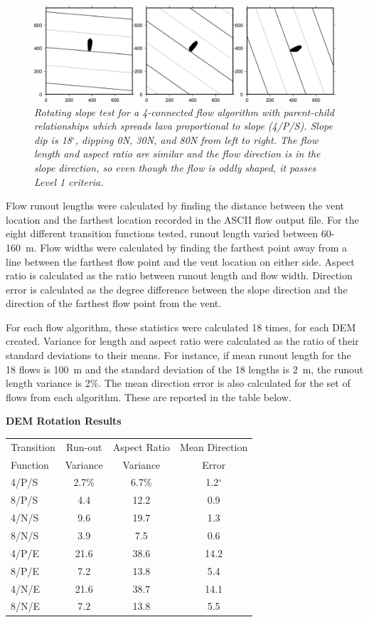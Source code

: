 \documentclass[12pt,letter]{article}
\begin{document}
	\begin{figure}[h!]
		\centering
		\includegraphics[width=\linewidth]{lava_C_4N_slope}
		\caption{\textit{Rotating slope test for a 4-connected flow algorithm with parent-child relationships which spreads lava proportional to slope (4/P/S). Slope dip is 18$^{\circ}$, dipping 0N, 30N, and 80N from left to right. The flow length and aspect ratio are similar and the flow direction is in the slope direction, so even though the flow is oddly shaped, it passes Level 1 criteria.}}
		\label{fig:slope}
	\end{figure}
	
	Flow runout lengths were calculated by finding the distance between the vent location and the farthest location recorded in the ASCII flow output file. For the eight different transition functions tested, runout length varied between 60-160~m. Flow widths were calculated by finding the farthest point away from a line between the farthest flow point and the vent location on either side. Aspect ratio is calculated as the ratio between runout length and flow width. Direction error is calculated as the degree difference between the slope direction and the direction of the farthest flow point from the vent.
	
	For each flow algorithm, these statistics were calculated 18 times, for each DEM created. Variance for length and aspect ratio were calculated as the ratio of their standard deviations to their means. For instance, if mean runout length for the 18 flows is 100~m and the standard deviation of the 18 lengths is 2~m, the runout length variance is 2\%. The mean direction error is also calculated for the set of flows from each algorithm. These are reported in the table below.

		\begin{center}
			\textbf{DEM Rotation Results}
			\begin{tabular}{l c c c}
				\toprule
				Transition&Run-out&Aspect Ratio&Mean Direction\\
				Function&Variance&Variance&Error\\
				\midrule
				4/P/S &2.7\%&6.7\%&1.2$^{\circ}$\\
				8/P/S &4.4&12.2&0.9\\
				4/N/S &9.6&19.7&1.3\\
				8/N/S &3.9&7.5&0.6\\
				4/P/E &21.6&38.6&14.2\\
				8/P/E &7.2&13.8&5.4\\
				4/N/E &21.6&38.7&14.1\\
				8/N/E &7.2&13.8&5.5\\
				
				\bottomrule
			\end{tabular}
		\end{center}
		
\end{document}
